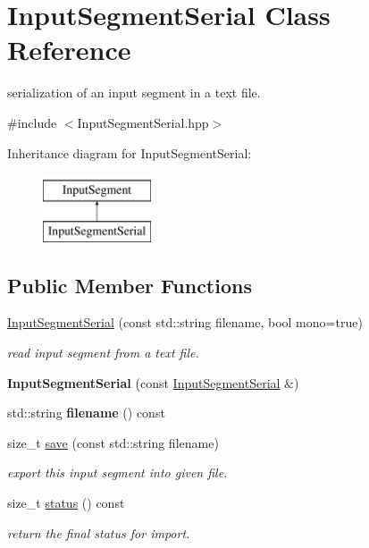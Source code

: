 \hypertarget{classInputSegmentSerial}{}\section{Input\+Segment\+Serial Class Reference}
\label{classInputSegmentSerial}


serialization of an input segment in a text file.  




{\ttfamily \#include $<$Input\+Segment\+Serial.\+hpp$>$}

Inheritance diagram for Input\+Segment\+Serial\+:\begin{figure}[H]
\begin{center}
\leavevmode
\includegraphics[height=2.000000cm]{classInputSegmentSerial}
\end{center}
\end{figure}
\subsection*{Public Member Functions}
\begin{DoxyCompactItemize}
\item 
\mbox{\hyperlink{classInputSegmentSerial_a82aef1422a814f19a81b8e15b7979f73}{Input\+Segment\+Serial}} (const std\+::string filename, bool mono=true)
\begin{DoxyCompactList}\small\item\em read input segment from a text file. \end{DoxyCompactList}\item 
\mbox{\label{classInputSegmentSerial_ac55f2e5708436d8db1a7c2f8dc23436d}} 
{\bfseries Input\+Segment\+Serial} (const \mbox{\hyperlink{classInputSegmentSerial}{Input\+Segment\+Serial}} \&)
\item 
\mbox{\label{classInputSegmentSerial_a4f66455606aaca9a289919b59c005991}} 
std\+::string {\bfseries filename} () const
\item 
\mbox{\label{classInputSegmentSerial_af1c586a042acb96f1e73807f423a039c}} 
size\+\_\+t \mbox{\hyperlink{classInputSegmentSerial_af1c586a042acb96f1e73807f423a039c}{save}} (const std\+::string filename)
\begin{DoxyCompactList}\small\item\em export this input segment into given file. \end{DoxyCompactList}\item 
size\+\_\+t \mbox{\hyperlink{classInputSegmentSerial_acaa3917f1ab9800b80155b8e1c16270d}{status}} () const
\begin{DoxyCompactList}\small\item\em return the final status for import. \end{DoxyCompactList}\end{DoxyCompactItemize}
